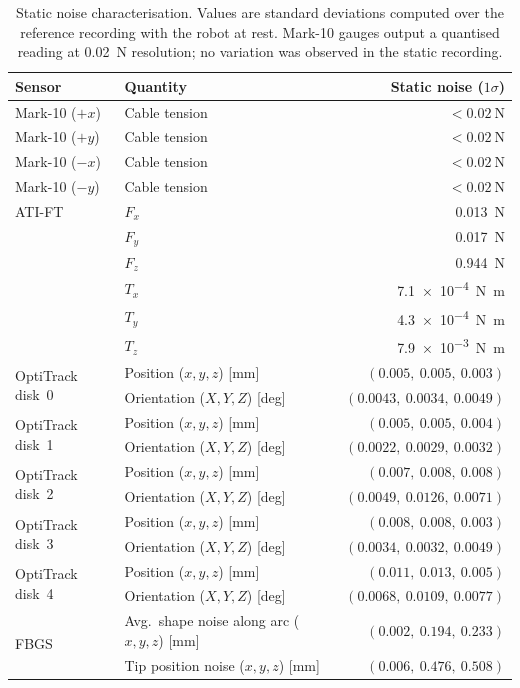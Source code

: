 \documentclass[14pt, a4paper]{article}
\begin{document}
\begin{table}[ht]
\centering
\caption{Static noise characterisation.
Values are standard deviations computed over the reference recording with the robot at rest.
Mark-10 gauges output a quantised reading at \SI{0.02}{\newton} resolution; no variation was observed in the static recording.}
\label{tab:sensor_noise}
\renewcommand{\arraystretch}{1.2}
\footnotesize
\begin{tabular}{@{} l l r @{}}
\toprule
\textbf{Sensor} & \textbf{Quantity} & \textbf{Static noise ($1\sigma$)} \\
\midrule
Mark-10 ($+x$) & Cable tension & $<\SI{0.02}{\newton}$ \\
Mark-10 ($+y$) & Cable tension & $<\SI{0.02}{\newton}$ \\
Mark-10 ($-x$) & Cable tension & $<\SI{0.02}{\newton}$ \\
Mark-10 ($-y$) & Cable tension & $<\SI{0.02}{\newton}$ \\
\midrule
ATI-FT & $F_x$ & \SI{0.013}{\newton} \\
       & $F_y$ & \SI{0.017}{\newton} \\
       & $F_z$ & \SI{0.944}{\newton} \\
       & $T_x$ & \SI{7.1e-4}{\newton\meter} \\
       & $T_y$ & \SI{4.3e-4}{\newton\meter} \\
       & $T_z$ & \SI{7.9e-3}{\newton\meter} \\
\midrule
\multirow{2}{*}{OptiTrack disk~0} & Position ($x,y,z$) [mm]    & $(0.005,\ 0.005,\ 0.003)$ \\
                                  & Orientation ($X,Y,Z$) [deg] & $(0.0043,\ 0.0034,\ 0.0049)$ \\
\multirow{2}{*}{OptiTrack disk~1} & Position ($x,y,z$) [mm]    & $(0.005,\ 0.005,\ 0.004)$ \\
                                  & Orientation ($X,Y,Z$) [deg] & $(0.0022,\ 0.0029,\ 0.0032)$ \\
\multirow{2}{*}{OptiTrack disk~2} & Position ($x,y,z$) [mm]    & $(0.007,\ 0.008,\ 0.008)$ \\
                                  & Orientation ($X,Y,Z$) [deg] & $(0.0049,\ 0.0126,\ 0.0071)$ \\
\multirow{2}{*}{OptiTrack disk~3} & Position ($x,y,z$) [mm]    & $(0.008,\ 0.008,\ 0.003)$ \\
                                  & Orientation ($X,Y,Z$) [deg] & $(0.0034,\ 0.0032,\ 0.0049)$ \\
\multirow{2}{*}{OptiTrack disk~4} & Position ($x,y,z$) [mm]    & $(0.011,\ 0.013,\ 0.005)$ \\
                                  & Orientation ($X,Y,Z$) [deg] & $(0.0068,\ 0.0109,\ 0.0077)$ \\
\midrule
\multirow{2}{*}{FBGS} & Avg.\ shape noise along arc ($x,y,z$) [mm] & $(0.002,\ 0.194,\ 0.233)$ \\
                      & Tip position noise ($x,y,z$) [mm]           & $(0.006,\ 0.476,\ 0.508)$ \\
\bottomrule
\end{tabular}
\end{table}
 
\end{document}
